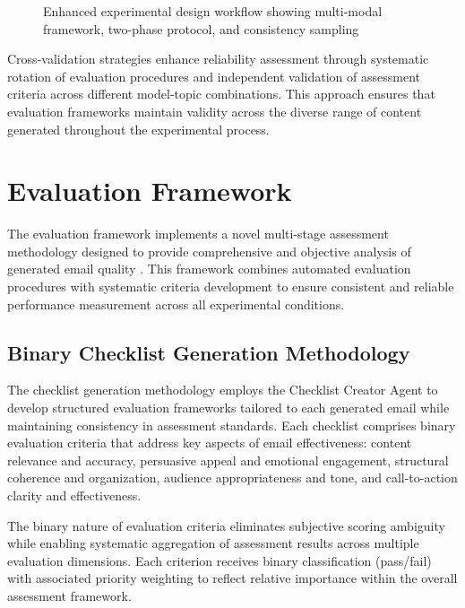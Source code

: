 \begin{figure}[htbp]
    \centering
    \caption{Enhanced experimental design workflow showing multi-modal framework, two-phase protocol, and consistency sampling}
    \label{fig:experimental-design}
\end{figure}

Cross-validation strategies enhance reliability assessment through systematic rotation of evaluation procedures and independent validation of assessment criteria across different model-topic combinations. This approach ensures that evaluation frameworks maintain validity across the diverse range of content generated throughout the experimental process.

\section{Evaluation Framework}
\label{sec:evaluation-framework}

The evaluation framework implements a novel multi-stage assessment methodology designed to provide comprehensive and objective analysis of generated email quality \cite{bohnet2022attributed_qa, pimentel2024beyond_metrics}. This framework combines automated evaluation procedures with systematic criteria development to ensure consistent and reliable performance measurement across all experimental conditions.

\subsection{Binary Checklist Generation Methodology}

The checklist generation methodology employs the Checklist Creator Agent to develop structured evaluation frameworks tailored to each generated email while maintaining consistency in assessment standards. Each checklist comprises binary evaluation criteria that address key aspects of email effectiveness: content relevance and accuracy, persuasive appeal and emotional engagement, structural coherence and organization, audience appropriateness and tone, and call-to-action clarity and effectiveness.

The binary nature of evaluation criteria eliminates subjective scoring ambiguity while enabling systematic aggregation of assessment results across multiple evaluation dimensions. Each criterion receives binary classification (pass/fail) with associated priority weighting to reflect relative importance within the overall assessment framework.

